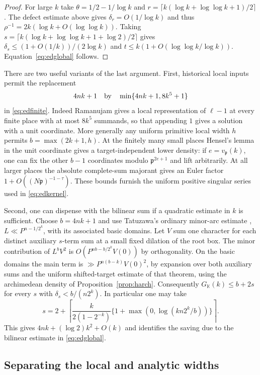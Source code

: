 \documentclass[11pt,letterpaper]{article}
\theoremstyle{definition}
\numberwithin{equation}{section}
\begin{document}
\begin{proof}
For large $k$ take $\theta=1/2-1/\log k$ and
$r=\lceil k(\log k+\log\log k+1)/2\rceil$. The defect estimate above
gives $\delta_r=O(1/\log k)$ and thus
$\rho^{-1}=2k(\log k+O(\log\log k))$. Taking
$s=\lceil k(\log k+\log\log k+1+\log2)/2\rceil$
gives $\delta_s\le (1+O(1/k))/(2\log k)$ and
$t\le k(1+O(\log\log k/\log k))$. Equation~\eqref{eq:edglobal}
follows.
\end{proof}

There are two useful variants of the last argument. First, historical
local inputs permit the replacement
\[
 4nk+1\quad\hbox{by}\quad\min\{4nk+1,8k^5+1\}
\]
in \eqref{eq:edfinite}. Indeed Ramanujam \cite{hram63} gives a local
representation of $\ell-1$ at every finite place with at most $8k^5$
summands, so that appending $1$ gives a solution with a unit coordinate.
More generally any uniform primitive local width $h$ permits
$b=\max(2k+1,h)$. At the finitely many small places Hensel's lemma in
the unit coordinate gives a target-independent lower density: if
$e=v_{\mathfrak p}(k)$, one can fix the other $b-1$ coordinates
modulo $\mathfrak p^{2e+1}$ and lift arbitrarily. At all larger places
the absolute complete-sum majorant gives an Euler factor
$1+O((N\mathfrak p)^{-1-\tau})$. These bounds furnish the uniform
positive singular series used in \eqref{eq:edkernel}.

Second, one can dispense with the bilinear sum if a quadratic estimate
in $k$ is sufficient. Choose $b=4nk+1$ and use Tatuzawa's ordinary
minor-arc estimate \cite[Lemma~2 and the proof of Theorem~5]{htat73},
$L\ll P^{n-1/2^k}$, with its associated basic domains. Let $V$ sum one
character for each distinct auxiliary $s$-term sum at a small fixed
dilation of the root box. The minor contribution of $L^bV^2$ is
$O(P^{nb-b/2^k}V(0))$ by orthogonality. On the basic domains the main
term is $\gg P^{n(b-k)}V(0)^2$, by expansion over both auxiliary sums
and the uniform shifted-target estimate of that theorem, using the
archimedean density of Proposition~\ref{prop:harch}. Consequently
$G_{\mathbb K}(k)\le b+2s$ for every $s$ with
$\delta_s<b/(n2^k)$. In particular one may take
\[
 s=2+\left\lceil\frac{k}{2(1-2^{-k})}
           \{1+\max(0,\log(kn2^k/b))\}\right\rceil .
\]
This gives $4nk+(\log2)k^2+O(k)$ and identifies the saving due to the
bilinear estimate in \eqref{eq:edglobal}.

\subsection{Separating the local and analytic widths}
\end{document}
